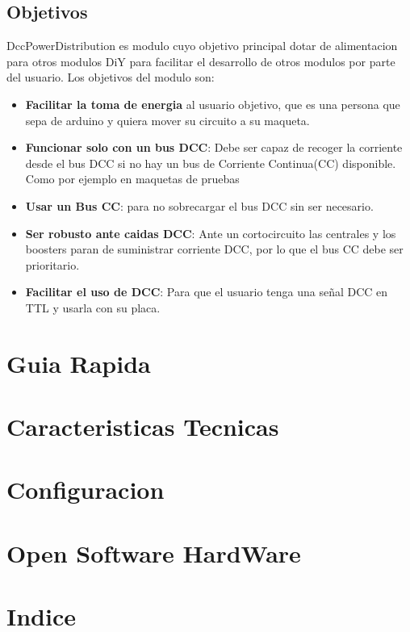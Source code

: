 \documentclass[spanish]{DccDiyTools}
\begin{document}
\subsection{Objetivos}
DccPowerDistribution es modulo cuyo objetivo principal dotar de alimentacion para otros modulos DiY
para facilitar el desarrollo de otros modulos por parte del usuario. Los objetivos del modulo son:
\begin{itemize}
    \item \textbf{Facilitar la toma de energia} al usuario objetivo, que es una persona que sepa
de arduino y quiera mover su circuito a su maqueta.   
    \item \textbf{Funcionar solo con un bus DCC}: Debe ser capaz de recoger la corriente desde el bus
DCC si no hay un bus de Corriente Continua(CC) disponible. Como por ejemplo en maquetas de pruebas
    \item \textbf{Usar un Bus CC}: para no sobrecargar el bus DCC sin ser necesario.
    \item \textbf{Ser robusto ante caidas DCC}: Ante un cortocircuito las centrales y los boosters 
paran de suministrar corriente DCC, por lo que el bus CC debe ser prioritario.
    \item \textbf{Facilitar el uso de DCC}: Para que el usuario tenga una señal DCC en TTL y usarla
con su placa.
\end{itemize}

\newpage
\section{Guia Rapida}


\newpage
\section{Caracteristicas Tecnicas}


\newpage
\section{Configuracion}


\newpage
\section{Open Software HardWare}

\newpage
\section{Indice}
\tableofcontents
\end{document}
